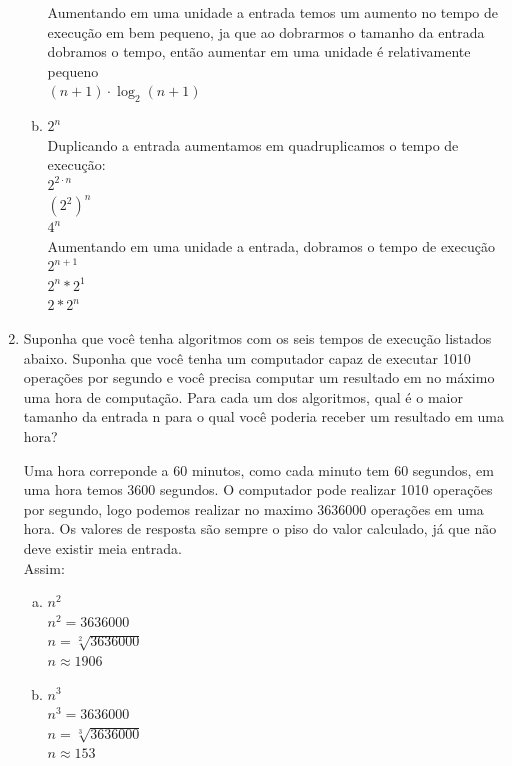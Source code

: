 \documentclass[a4paper,10pt]{article}
\begin{document}
\begin{enumerate}
\begin{enumerate}[(a)]
Aumentando em uma unidade a entrada temos um aumento no tempo de execução 
em bem pequeno, ja que ao dobrarmos o tamanho da entrada dobramos o tempo, 
então aumentar em uma unidade é relativamente pequeno\\
$(n+1) \cdot \log_2(n+1)$\\

\item $2^n$\\
Duplicando a entrada aumentamos em quadruplicamos o tempo de execução:\\
$2^{2 \cdot n}$\\
$(2^2)^n$\\
$4^n$\\

Aumentando em uma unidade a entrada, dobramos o tempo de execução\\
$2^{n+1}$\\
$2^n*2^1$\\
$2*2^n$\\


  \end{enumerate}

\item Suponha que você tenha algoritmos com os seis tempos de execução listados abaixo. 
Suponha que você tenha um computador capaz de executar 1010 operações por segundo
e você precisa computar um resultado em no máximo uma hora de computação. Para
cada um dos algoritmos, qual é o maior tamanho da entrada n para o qual você poderia
receber um resultado em uma hora?

Uma hora correponde a 60 minutos, como cada minuto tem 60 segundos, em uma hora temos 3600 segundos.
O computador pode realizar 1010 operações por segundo, logo podemos realizar no maximo 3636000 operações em uma hora.
Os valores de resposta são sempre o piso do valor calculado, já que não deve existir meia entrada.\\

Assim:

  \begin{enumerate}[(a)]
\item $n^2$\\
$n^2=3636000$\\
$n=\sqrt[2]{3636000}$\\
$n\approx{1906}$\\

\pagebreak

\item $n^3$\\
$n^3=3636000$\\
$n=\sqrt[3]{3636000}$\\
$n\approx{153}$\\


\end{enumerate}
\end{enumerate}
\end{document}
